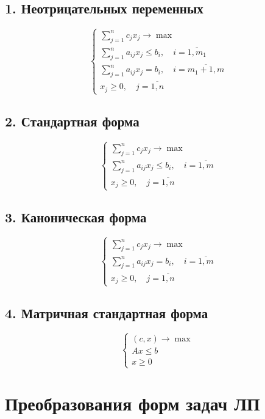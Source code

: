\documentclass[17pt]{extarticle}
\begin{document}
\subsection{1. Неотрицательных переменных}
\[
    \begin{cases}
        \sum\limits_{j=1}^{n} c_j x_j \to \max                               \\
        \sum\limits_{j=1}^{n} a_{ij} x_j \le b_i, \quad i = \overline{1,m_1} \\
        \sum\limits_{j=1}^{n} a_{ij} x_j = b_i, \quad i = \overline{m_1+1,m} \\
        x_j \ge 0, \quad j = \overline{1,n}
    \end{cases}
\]

\subsection{2. Стандартная форма}
\[
    \begin{cases}
        \sum\limits_{j=1}^{n} c_j x_j \to \max                             \\
        \sum\limits_{j=1}^{n} a_{ij} x_j \le b_i, \quad i = \overline{1,m} \\
        x_j \ge 0, \quad j = \overline{1,n}
    \end{cases}
\]

\subsection{3. Каноническая форма}
\[
    \begin{cases}
        \sum\limits_{j=1}^{n} c_j x_j \to \max                           \\
        \sum\limits_{j=1}^{n} a_{ij} x_j = b_i, \quad i = \overline{1,m} \\
        x_j \ge 0, \quad j = \overline{1,n}
    \end{cases}
\]

\subsection{4. Матричная стандартная форма}
\[
    \begin{cases}
        (c, x) \to \max \\
        A x \le b       \\
        x \ge 0
    \end{cases}
\]




\section{Преобразования форм задач ЛП}
\end{document}
